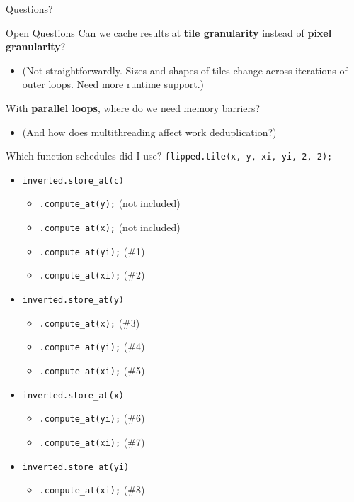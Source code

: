 \documentclass[xcolor=dvipsnames]{beamer}
\begin{document}
\begin{frame}{Questions?}
\end{frame}


\begin{frame}{Open Questions}
	Can we cache results at {\bf tile granularity} instead of {\bf pixel granularity}?
	\begin{itemize}
		\item (Not straightforwardly. Sizes and shapes of tiles change across iterations of outer loops. Need more runtime support.)
	\end{itemize}
	\linegap

	With {\bf parallel loops}, where do we need memory barriers?
	\begin{itemize}
		\item (And how does multithreading affect work deduplication?)
	\end{itemize}
	\linegap

\end{frame}

\begin{frame}{Which function schedules did I use?}
	\texttt{flipped.tile(x, y, xi, yi, 2, 2);}
	\pause
	\linegap

	\begin{itemize}
		\item \texttt{inverted.store\_at(c)}
		\begin{itemize}
			\item \texttt{.compute\_at(y);} (not included)
			\item \texttt{.compute\_at(x);} (not included)
			\item \texttt{.compute\_at(yi);} (\#1)
			\item \texttt{.compute\_at(xi);} (\#2)
		\end{itemize}
		\item \texttt{inverted.store\_at(y)}
		\begin{itemize}
			\item \texttt{.compute\_at(x);} (\#3)
			\item \texttt{.compute\_at(yi);} (\#4)
			\item \texttt{.compute\_at(xi);} (\#5)
		\end{itemize}
		\item \texttt{inverted.store\_at(x)}
		\begin{itemize}
			\item \texttt{.compute\_at(yi);} (\#6)
			\item \texttt{.compute\_at(xi);} (\#7)
		\end{itemize}
		\item \texttt{inverted.store\_at(yi)}
		\begin{itemize}
			\item \texttt{.compute\_at(xi);} (\#8)
		\end{itemize}
	\end{itemize}
	
\end{frame}
\end{document}

